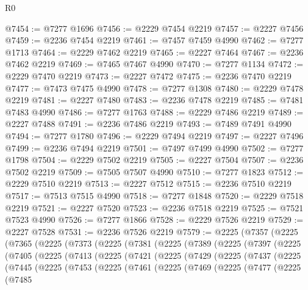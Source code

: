 \begin{lexlean}{R0}
\begin{coremodule}
@7454 := @7277 @1696
@7456 := @2229 @7454 @2219
@7457 := @2227 @7456
@7459 := @2236 @7454 @2219
@7461 := @7457 @7459 @4990
@7462 := @7277 @1713
@7464 := @2229 @7462 @2219
@7465 := @2227 @7464
@7467 := @2236 @7462 @2219
@7469 := @7465 @7467 @4990
@7470 := @7277 @1134
@7472 := @2229 @7470 @2219
@7473 := @2227 @7472
@7475 := @2236 @7470 @2219
@7477 := @7473 @7475 @4990
@7478 := @7277 @1308
@7480 := @2229 @7478 @2219
@7481 := @2227 @7480
@7483 := @2236 @7478 @2219
@7485 := @7481 @7483 @4990
@7486 := @7277 @1763
@7488 := @2229 @7486 @2219
@7489 := @2227 @7488
@7491 := @2236 @7486 @2219
@7493 := @7489 @7491 @4990
@7494 := @7277 @1780
@7496 := @2229 @7494 @2219
@7497 := @2227 @7496
@7499 := @2236 @7494 @2219
@7501 := @7497 @7499 @4990
@7502 := @7277 @1798
@7504 := @2229 @7502 @2219
@7505 := @2227 @7504
@7507 := @2236 @7502 @2219
@7509 := @7505 @7507 @4990
@7510 := @7277 @1823
@7512 := @2229 @7510 @2219
@7513 := @2227 @7512
@7515 := @2236 @7510 @2219
@7517 := @7513 @7515 @4990
@7518 := @7277 @1848
@7520 := @2229 @7518 @2219
@7521 := @2227 @7520
@7523 := @2236 @7518 @2219
@7525 := @7521 @7523 @4990
@7526 := @7277 @1866
@7528 := @2229 @7526 @2219
@7529 := @2227 @7528
@7531 := @2236 @7526 @2219
@7579 := @2225
    (@7357
      (@2225
        (@7365
          (@2225
            (@7373
              (@2225
                (@7381
                  (@2225
                    (@7389
                      (@2225
                        (@7397
                          (@2225
                            (@7405
                              (@2225
                                (@7413
                                  (@2225
                                    (@7421
                                      (@2225
                                        (@7429
                                          (@2225
                                            (@7437
                                              (@2225
                                                (@7445
                                                  (@2225
                                                    (@7453
                                                      (@2225
                                                        (@7461
                                                          (@2225
                                                            (@7469
                                                              (@2225
                                                                (@7477
                                                                  (@2225
                                                                    (@7485

\end{coremodule}
\end{lexlean}
